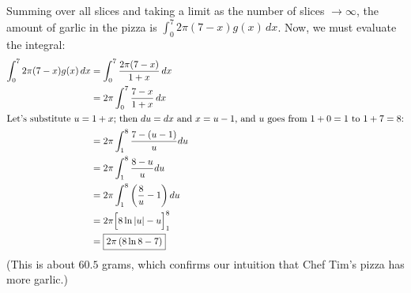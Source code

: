 \documentclass{article}
\begin{document}
\begin{enumerate}
\begin{enumerate}
\begin{solution}
      Summing over all slices and taking a limit as the number
      of slices $\to \infty$, the amount of garlic in the pizza is
      $\displaystyle \int_0^7 2 \pi (7-x) g(x)\,dx$.  Now, we must
      evaluate the integral:
      \begin{align*}
        \int_0^7 2 \pi (7-x) g(x)\,dx &= \int_0^7 \frac{2 \pi (7-x)}{1 + x}\,dx \\
        &= 2 \pi \int_0^7 \frac{7-x}{1+x}\,dx \\
        \intertext{Let's substitute $u = 1+x$; then $du = dx$ and $x =
          u-1$, and $u$ goes from $1 + 0 = 1$ to $1 + 7 = 8$:} %
        &= 2 \pi \int_1^8 \frac{7- (u-1)}{u} du \\
        &= 2 \pi \int_1^8 \frac{8-u}{u} du \\
        &= 2 \pi \int_1^8 \left(\frac{8}{u} - 1 \right) du \\
        &= 2 \pi \Bigl[8 \ln |u| - u \Bigr]_1^8 \\
        &= \boxed{2 \pi \left( 8 \ln 8 - 7 \right)}
      \end{align*}
      (This is about $60.5$ grams, which confirms our intuition that
      Chef Tim's pizza has more garlic.)
    \end{solution}

  \end{enumerate}





\end{enumerate}
\end{document}
